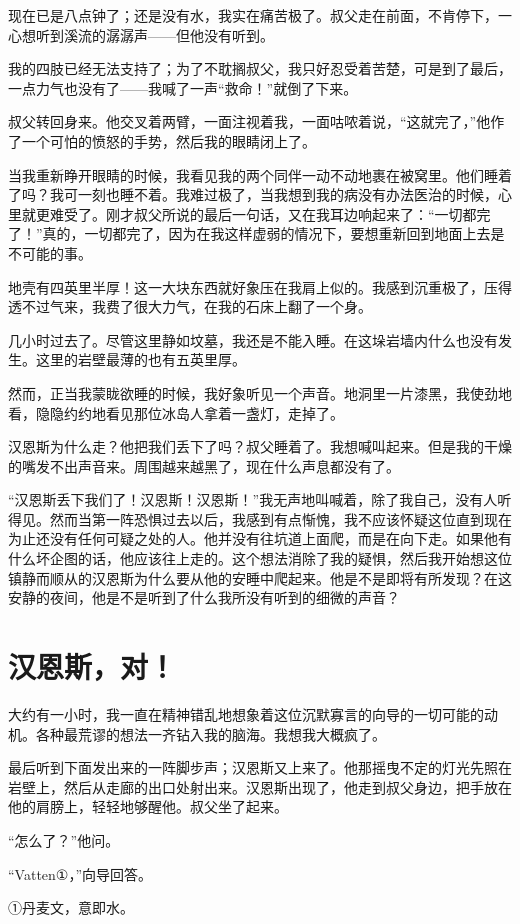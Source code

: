 \documentclass[10pt]{book}
\begin{document}
现在已是八点钟了；还是没有水，我实在痛苦极了。叔父走在前面，不肯停下，一心想听到溪流的潺潺声——但他没有听到。

我的四肢已经无法支持了；为了不耽搁叔父，我只好忍受着苦楚，可是到了最后，一点力气也没有了——我喊了一声“救命！”就倒了下来。

叔父转回身来。他交叉着两臂，一面注视着我，一面咕哝着说，“这就完了，”他作了一个可怕的愤怒的手势，然后我的眼睛闭上了。

当我重新睁开眼睛的时候，我看见我的两个同伴一动不动地裹在被窝里。他们睡着了吗？我可一刻也睡不着。我难过极了，当我想到我的病没有办法医治的时候，心里就更难受了。刚才叔父所说的最后一句话，又在我耳边响起来了：“一切都完了！”真的，一切都完了，因为在我这样虚弱的情况下，要想重新回到地面上去是不可能的事。

地壳有四英里半厚！这一大块东西就好象压在我肩上似的。我感到沉重极了，压得透不过气来，我费了很大力气，在我的石床上翻了一个身。

几小时过去了。尽管这里静如坟墓，我还是不能入睡。在这垛岩墙内什么也没有发生。这里的岩壁最薄的也有五英里厚。

然而，正当我蒙眬欲睡的时候，我好象听见一个声音。地洞里一片漆黑，我使劲地看，隐隐约约地看见那位冰岛人拿着一盏灯，走掉了。

汉恩斯为什么走？他把我们丢下了吗？叔父睡着了。我想喊叫起来。但是我的干燥的嘴发不出声音来。周围越来越黑了，现在什么声息都没有了。

“汉恩斯丢下我们了！汉恩斯！汉恩斯！”我无声地叫喊着，除了我自己，没有人听得见。然而当第一阵恐惧过去以后，我感到有点惭愧，我不应该怀疑这位直到现在为止还没有任何可疑之处的人。他并没有往坑道上面爬，而是在向下走。如果他有什么坏企图的话，他应该往上走的。这个想法消除了我的疑惧，然后我开始想这位镇静而顺从的汉恩斯为什么要从他的安睡中爬起来。他是不是即将有所发现？在这安静的夜间，他是不是听到了什么我所没有听到的细微的声音？
\chapter{汉恩斯，对！}
大约有一小时，我一直在精神错乱地想象着这位沉默寡言的向导的一切可能的动机。各种最荒谬的想法一齐钻入我的脑海。我想我大概疯了。

最后听到下面发出来的一阵脚步声；汉恩斯又上来了。他那摇曳不定的灯光先照在岩壁上，然后从走廊的出口处射出来。汉恩斯出现了，他走到叔父身边，把手放在他的肩膀上，轻轻地够醒他。叔父坐了起来。

“怎么了？”他问。

“Vatten①，”向导回答。

①丹麦文，意即水。
\end{document}
